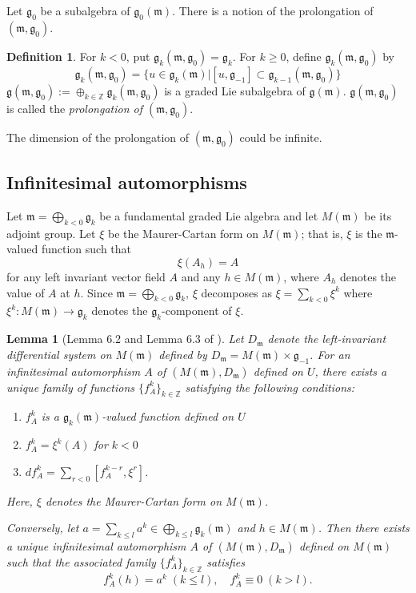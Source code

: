 \documentclass{amsart}
\newtheorem{lemma}[theorem]{Lemma}
\theoremstyle{definition}
\newtheorem{definition}{Definition}
\theoremstyle{remark}
\newcommand{\Z}{\mathbb{Z}}
\newcommand{\g}{\mathfrak{g}}
\newcommand{\m}{\mathfrak{m}}
\begin{document}
Let $\g_0$ be a subalgebra of $\g_0(\m)$. There is a notion of the prolongation of $(\m, \g_0)$.

\begin{definition}
For $k < 0$, put $\g_k(\m, \g_0) = \g_k$. For $k \geq 0$, define $\g_k(\m, \g_0)$ by
\[
\g_k(\m, \g_0) = \{u \in \g_k(\m) | [u, \g_{-1}] \subset \g_{k-1}(\m, \g_0)\}
\]
$\g(\m, \g_0) := \oplus_{k \in \Z} \g_k(\m, \g_0)$ is a graded Lie subalgebra of $\g(\m)$. $\g(\m, \g_0)$ is called the {\it prolongation of $(\m, \g_0)$}.
\end{definition}

The dimension of the prolongation of $(\m, \g_0)$ could be infinite.



\subsection{Infinitesimal automorphisms}
\label{sec:Infitiesimal automorphisms}

Let $\m = \bigoplus_{k< 0} \g_k$ be a fundamental graded Lie algebra and let $M(\m)$ be its adjoint group. Let $\xi$ be the Maurer-Cartan form on $M(\m)$; that is, $\xi$ is the $\m$-valued function such that 
\[\xi(A_h) = A\]
for any left invariant vector field $A$ and any $h \in M(\m)$, where $A_h$ denotes the value of $A$ at $h$. Since $\m = \bigoplus_{k < 0} \g_k$, $\xi$ decomposes as $\xi = \sum_{k < 0} \xi^k$ where $\xi^k : M(\m) \to \g_k$ denotes the $\g_k$-component of $\xi$. 


\begin{lemma}[Lemma 6.2 and Lemma 6.3 of \cite{T}]
\label{Tanaka}
Let $D_\m$ denote the left-invariant differential system on $M(\m)$ defined by $D_\m = M(\m) \times \g_{-1}$. For an infinitesimal automorphism $A$ of $(M(\m), D_\m)$ defined on $U$, there exists a unique family of functions $\{f_A^k\}_{k \in \Z}$ satisfying the following conditions:
\begin{enumerate}[label = (\arabic*)]
    \item $f_A^k$ is a $\g_k(\m)$-valued function defined on $U$
    \item $f_A^k = \xi^k(A)$ for $k < 0$
    \item $df_A^k = \sum_{r < 0} [f_A^{k-r}, \xi^r]$.
\end{enumerate}
Here, $\xi$ denotes the Maurer-Cartan form on $M(\m)$.

Conversely, let $a = \sum_{k \leq l} a^k \in \bigoplus_{k \leq l}\g_k(\m)$ and $h \in M(\m)$. Then there exists a unique infinitesimal automorphism $A$ of $(M(\m), D_\m)$ defined on $M(\m)$ such that the associated family $\{f_A^k\}_{k \in \Z}$ satisfies 
\[f_A^k(h) = a^k \; (k \leq l), \quad f_A^k \equiv 0 \; (k > l).\]
\end{lemma}
\end{document}
